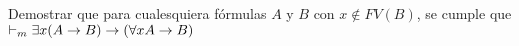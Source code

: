 \documentclass[11pt,letterpaper]{article}
\begin{document}
% 


\item Demostrar que para cualesquiera f\'ormulas $A$ y $B$ 
con $x\notin FV( B)$, se cumple que 
  $\vdash_m \exists x( A\rightarrow B)\rightarrow (\forall x A\rightarrow B)$
\end{document}
